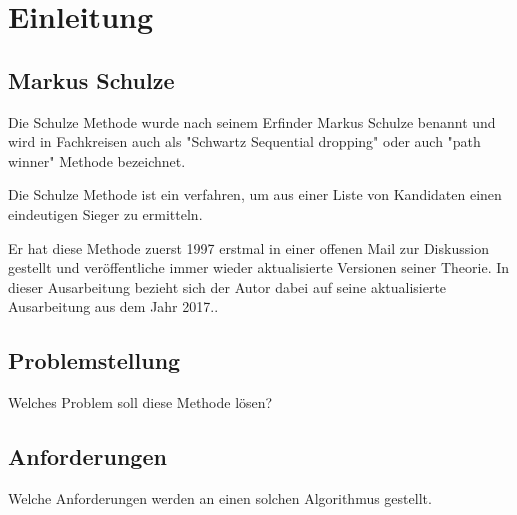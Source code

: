 \section{Einleitung}
\label{sec:Einleitung}


\subsection{Markus Schulze} 
\label{sec:markusSchulze}
Die Schulze Methode wurde nach seinem Erfinder Markus Schulze benannt und wird in Fachkreisen auch als "Schwartz Sequential dropping" oder auch "path winner" Methode bezeichnet.

Die Schulze Methode ist ein verfahren, um aus einer Liste von Kandidaten einen eindeutigen Sieger zu ermitteln.

Er hat diese Methode zuerst 1997 erstmal in einer offenen Mail zur Diskussion gestellt und veröffentliche immer wieder aktualisierte Versionen seiner Theorie. In dieser Ausarbeitung bezieht sich der Autor dabei auf seine aktualisierte Ausarbeitung aus dem Jahr 2017.\citet[vgl.]{Schulze2017}.

\subsection{Problemstellung} 
\label{sec:problemstellung}
Welches Problem soll diese Methode lösen?

\subsection{Anforderungen} 
\label{sec:anforderungen}
Welche Anforderungen werden an einen solchen Algorithmus gestellt.





